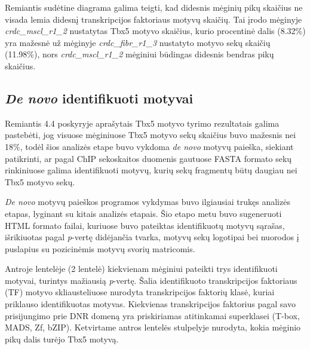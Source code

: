 \documentclass[12pt]{article}
\begin{document}
Remiantis sudėtine diagrama galima teigti, kad didesnis mėginių pikų skaičius
ne visada lemia didesnį transkripcijos faktoriaus motyvų skaičių. Tai įrodo
mėginyje \small\emph{crdc\_mscl\_r1\_2} nustatytas Tbx5 motyvo skaičius,
kurio procentinė dalis (8.32\%) yra mažesnė už mėginyje
\small\emph{crdc\_fibr\_r1\_3} nustatyto motyvo sekų skaičių (11.98\%),
nors \small\emph{crdc\_mscl\_r1\_2} mėginiui būdingas didesnis bendras pikų
skaičius.

\newpage

\subsection{\emph{De novo} identifikuoti motyvai}
Remiantis 4.4 poskyryje aprašytais Tbx5 motyvo tyrimo rezultatais galima
pastebėti, jog visuose mėginiuose Tbx5 motyvo sekų skaičius buvo mažesnis nei 18\%, todėl
šios analizės etape buvo vykdoma \emph{de novo} motyvų paieška, siekiant
patikrinti, ar pagal ChIP sekoskaitos duomenis gautuose FASTA formato sekų
rinkiniuose galima identifikuoti motyvų, kurių sekų fragmentų būtų daugiau
nei Tbx5 motyvo sekų.

\emph{De novo} motyvų paieškos programos vykdymas buvo ilgiausiai trukęs
analizės etapas, lyginant su kitais analizės etapais. Šio etapo metu buvo
sugeneruoti HTML formato failai, kuriuose buvo pateiktas identifikuotų
motyvų sąrašas, išrikiuotas pagal \emph{p}-vertę didėjančia tvarka,
motyvų sekų logotipai bei nuorodos į puslapius su pozicinėmis motyvų
svorių matricomis.

Antroje lentelėje (2 lentelė) kiekvienam mėginiui pateikti trys identifikuoti
motyvai, turintys mažiausią \emph{p}-vertę.
Šalia identifikuoto transkripcijos faktoriaus (TF) motyvo skliausteliuose
nurodyta transkripcijos faktorių klasė, kuriai priklauso identifikuotas
motyvas. Kiekvienas transkripcijos faktorius pagal savo prisijungimo
prie DNR domeną yra priskiriamas atitinkamai superklasei (T-box, MADS, Zf, bZIP).
Ketvirtame antros lentelės stulpelyje nurodyta, kokia mėginio pikų dalis
turėjo Tbx5 motyvą.
\end{document}
